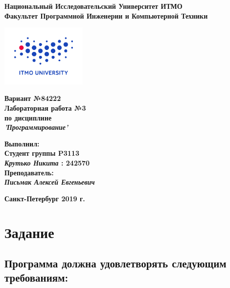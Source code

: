 \documentclass[11pt]{article}
\author{Krutko Nikita / KrutNA}
\date{\today}
\title{}
\begin{document}
\large
\thispagestyle{empty}
\begin{center}
\textbf{Национальный Исследовательский Университет ИТМО}\\
\textbf{Факультет Программной Инженерии и Компьютерной Техники}\\
\end{center}
\vspace{2em}
\begin{center}
\includegraphics[width=120pt]{itmo-logo.png}
\end{center}
\LARGE
\vspace{5em}
\begin{center}
\textbf{Вариант №84222}\\
\textbf{Лабораторная работа №3}\\
\Large
\textbf{по дисциплине}\\
\LARGE
\textbf{\emph{'Программирование'}}\\
\end{center}
\vspace{11em}
\large
\begin{flushright}
\textbf{Выполнил:}\\
\textbf{Студент группы P3113}\\
\textbf{\emph{Крутько Никита} : 242570}\\
\textbf{Преподаватель:}\\
\textbf{\emph{Письмак Алексей Евгеньевич}}\\
\end{flushright}
\vspace{4em}
\large
\begin{center}
\textbf{Санкт-Петербург 2019 г.}
\end{center}
\pagebreak{}
\setcounter{tocdepth}{2}
\tableofcontents
\vspace{2em}
\section{Задание}
\label{sec:org5ce9b12}

\subsection{Программа должна удовлетворять следующим требованиям:}
\label{sec:org4ba01f6}
\end{document}
